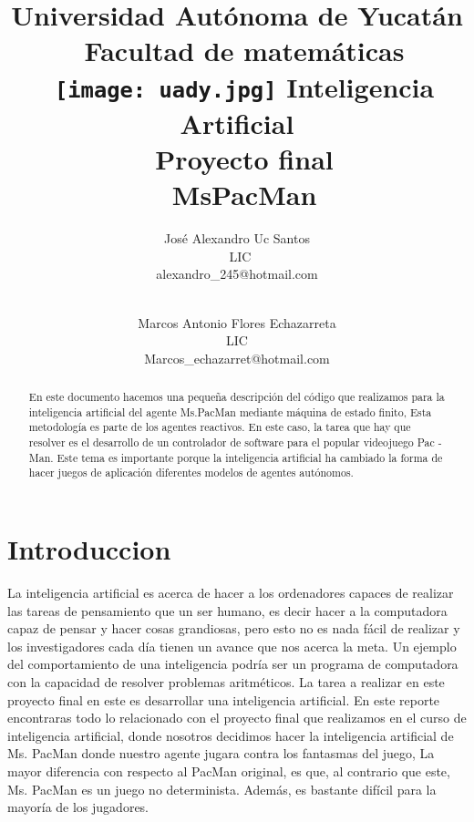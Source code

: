 \documentclass[11pt]{article}
\begin{document}
\title{Universidad Autónoma de Yucatán\\\
Facultad de matemáticas\\\
\texttt{[image: uady.jpg]}
\linebreak
Inteligencia Artificial\\\
Proyecto final\\\
MsPacMan }


\author{José Alexandro Uc Santos\\\
LIC \\
alexandro\_245@hotmail.com\and \\
\linebreak
Marcos Antonio Flores Echazarreta \\
LIC\\
Marcos\_echazarret@hotmail.com\\
\linebreak}

\maketitle

\newpage 
\begin{abstract}
En este documento hacemos una pequeña descripción del código que realizamos para la inteligencia artificial del agente Ms.PacMan mediante máquina de estado finito, Esta metodología es parte de los agentes reactivos. En este caso, la tarea que hay que resolver es el desarrollo de un controlador de software para el popular videojuego Pac - Man. Este tema es importante porque la inteligencia artificial ha cambiado la forma de hacer juegos de aplicación diferentes modelos de agentes autónomos.
\linebreak
\end{abstract}

\section{Introduccion}
La inteligencia artificial es acerca de hacer a los ordenadores capaces de realizar las tareas de pensamiento que un ser humano, es decir hacer a la computadora capaz de pensar y hacer cosas grandiosas, pero esto no es nada fácil de realizar y los investigadores cada día tienen un avance que nos acerca la meta. Un ejemplo del comportamiento de una inteligencia podría ser un programa de computadora con la capacidad de resolver problemas aritméticos. 
La tarea a realizar en este proyecto final en este es desarrollar una inteligencia artificial.  
En este reporte encontraras todo lo relacionado con el proyecto final que realizamos en el curso de inteligencia artificial, donde nosotros decidimos hacer la inteligencia artificial de Ms. PacMan donde nuestro agente jugara contra los fantasmas del juego, La mayor diferencia con respecto al PacMan original, es que, al contrario que este, Ms. PacMan es un juego no determinista. Además, es bastante difícil para la mayoría de los jugadores. 
\linebreak
\end{document}
